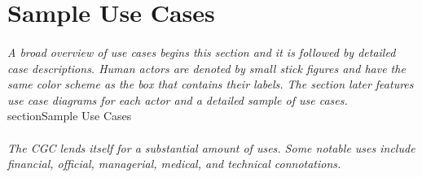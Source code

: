 \documentclass[12pt]{article}
\begin{document}
\section{Sample Use Cases} \label{samp}
\paragraph{} \textit{A broad overview of use cases begins this section and it is followed 
by detailed case descriptions. Human actors are denoted by small stick figures and have the 
same color scheme as the box that contains their labels. The section later features use case 
diagrams for each actor and a detailed sample of use cases.}
section{Sample Use Cases}
\paragraph{} \textit{The CGC lends itself for a substantial amount of uses. Some notable uses include financial,
official, managerial, medical, and technical connotations.}
\end{document}
